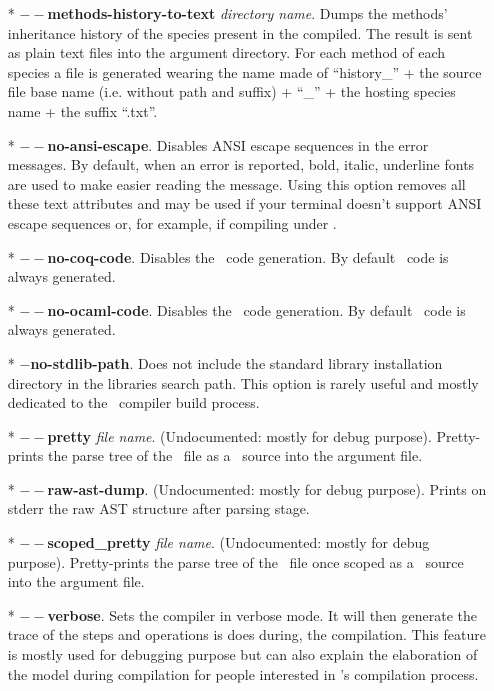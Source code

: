 \begin{itemize}
 \item[*] {\bf $--$methods-history-to-text} {\em directory
   name}. Dumps the methods' inheritance history of the species
   present in the compiled. The result is sent as plain text files
   into the argument directory. For each method of each species a file
   is generated wearing the name made of ``history\_'' + the source
   file base name (i.e. without path and suffix) + ``\_'' + the
   hosting species name + the suffix ``.txt''.

  \item[*] {\bf $--$no-ansi-escape}. Disables ANSI escape sequences in
    the error messages. By default, when an error is reported, bold,
    italic, underline fonts are used to make easier reading the
    message. Using this option removes all these text attributes and
    may be used if your terminal doesn't support ANSI escape sequences
    or, for example, if compiling under \emacs.

  \item[*] {\bf $--$no-coq-code}. Disables the \coq\ code
    generation. By default \coq\ code is always generated.

  \item[*] {\bf $--$no-ocaml-code}. Disables the \ocaml\ code
    generation. By default \ocaml\ code is always generated.

   \item[*] {\bf $-$no-stdlib-path}. Does not include the standard
    library installation directory in the libraries search path. This
    option is rarely useful and mostly dedicated to the
    \focal\ compiler build process.

  \item[*] {\bf $--$pretty} {\em file name}. (Undocumented: mostly for
    debug purpose). Pretty-prints the parse tree of the \focal\ file
    as a \focal\ source into the argument file.

  \item[*] {\bf $--$raw-ast-dump}. (Undocumented: mostly for debug
    purpose). Prints on stderr the raw AST structure after parsing
    stage.

 \item[*] {\bf $--$scoped\_pretty} {\em file name}. (Undocumented:
   mostly for debug purpose). Pretty-prints the parse tree of the
   \focal\ file once scoped as a \focal\ source into the argument
   file.

  \item[*] {\bf $--$verbose}. Sets the compiler in verbose mode. It
    will then generate the trace of the steps and operations is does
    during, the compilation. This feature is mostly used for debugging
    purpose but can also explain the elaboration of the model during
    compilation for people interested in \focal's compilation
    process.


\end{itemize}

